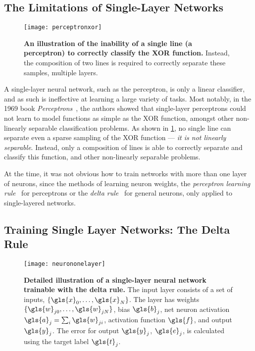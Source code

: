 \documentclass[thesis]{subfiles}
\begin{document}
\subsection{The Limitations of Single-Layer Networks}\label{singlelayernetworks}
\begin{figure}[tbp]
\centering
\texttt{[image: perceptronxor]}
\caption[An illustration of the inability to correctly classify the XOR function]{\textbf{An illustration of the inability of a single line (\ie a perceptron) to correctly classify the XOR function.} Instead, the composition of two lines is required to correctly separate these samples, \ie multiple layers.}
\label{fig:perceptronxor}
\end{figure}
A single-layer neural network, such as the perceptron, is only a linear classifier, and as such is ineffective at learning a large variety of tasks. Most notably, in the 1969 book \emph{Perceptrons}~\citep{minsky1988perceptrons}, the authors showed that single-layer perceptrons could not learn to model functions as simple as the XOR function, amongst other non-linearly separable classification problems. As shown in \cref{fig:perceptronxor}, no single line can separate even a sparse sampling of the XOR function --- \ie\emph{it is not linearly separable}. Instead, only a composition of lines is able to correctly separate and classify this function, and other non-linearly separable problems.

At the time, it was not obvious how to train networks with more than one layer of neurons, since the methods of learning neuron weights, the \emph{perceptron learning rule}~\citep{rosenblatt1961principles} for perceptrons or the \emph{delta rule}~\citep{widrow1960adaptive} for general neurons, only applied to single-layered networks. %

\subsection{Training Single Layer Networks: The Delta Rule}
\label{deltarule}
\begin{figure}[tbp]
\centering
\texttt{[image: neurononelayer]}
\caption[Detailed illustration of a single-layer neural network]{\textbf{Detailed illustration of a single-layer neural network trainable with the delta rule.} The input layer consists of a set of inputs, $\{\gls{x}_{0}, \ldots, \gls{x}_{N}\}$. The layer has weights $\{\gls{w}_{j0}, \ldots, \gls{w}_{jN}\}$, bias $\gls{b}_j$, net neuron activation $\gls{a}_j = \sum_i \gls{w}_{ji}$, activation function $\gls{f}$, and output $\gls{y}_j$. The error for output $\gls{y}_j$, $\gls{e}_j$, is calculated using the target label $\gls{t}_j$.}
\label{fig:neurononelayer}
\end{figure}
\end{document}
